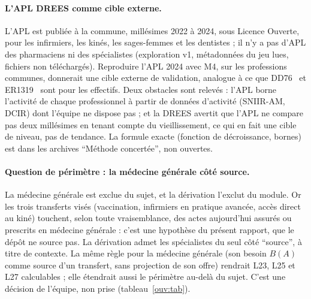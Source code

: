 \paragraph{L'APL DREES comme cible externe.}
L'APL est publiée à la commune, millésimes 2022 à 2024, sous Licence Ouverte, pour les infirmiers, les kinés, les sages-femmes et les dentistes ; il n'y a pas d'APL des pharmaciens ni des spécialistes (exploration v1, métadonnées du jeu lues, fichiers non téléchargés).
Reproduire l'APL 2024 avec M4, sur les professions communes, donnerait une cible externe de validation, analogue à ce que DD76~\citep{e-dd76} et ER1319~\citep{e-er1319} sont pour les effectifs.
Deux obstacles sont relevés : l'APL borne l'activité de chaque professionnel à partir de données d'activité (SNIIR-AM, DCIR) dont l'équipe ne dispose pas ; et la DREES avertit que l'APL ne compare pas deux millésimes en tenant compte du vieillissement, ce qui en fait une cible de niveau, pas de tendance.
La formule exacte (fonction de décroissance, bornes) est dans les archives \enquote{Méthode concertée}, non ouvertes.

\paragraph{Question de périmètre : la médecine générale côté source.}
La médecine générale est exclue du sujet, et la dérivation l'exclut du module.
Or les trois transferts visés (vaccination, infirmiers en pratique avancée, accès direct au kiné) touchent, selon toute vraisemblance, des actes aujourd'hui assurés ou prescrits en médecine générale : c'est une hypothèse du présent rapport, que le dépôt ne source pas.
La dérivation admet les spécialistes du seul côté \enquote{source}, à titre de contexte. La même règle pour la médecine générale (son besoin $B(A)$ comme source d'un transfert, sans projection de son offre) rendrait L23, L25 et L27 calculables ; elle étendrait aussi le périmètre au-delà du sujet.
C'est une décision de l'équipe, non prise (tableau~\ref{ouv:tab}).
\endgroup
